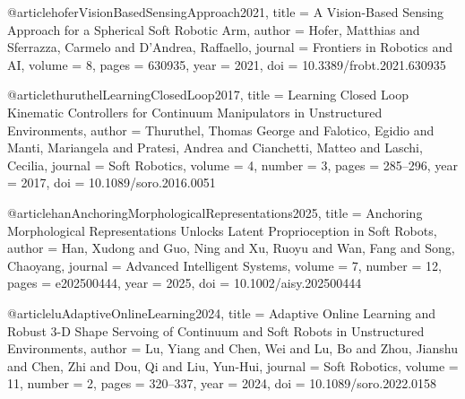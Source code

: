 @article{hoferVisionBasedSensingApproach2021,
  title = {A Vision-Based Sensing Approach for a Spherical Soft Robotic Arm},
  author = {Hofer, Matthias and Sferrazza, Carmelo and D'Andrea, Raffaello},
  journal = {Frontiers in Robotics and AI},
  volume = {8},
  pages = {630935},
  year = {2021},
  doi = {10.3389/frobt.2021.630935}
}

@article{thuruthelLearningClosedLoop2017,
  title = {Learning Closed Loop Kinematic Controllers for Continuum Manipulators in Unstructured Environments},
  author = {Thuruthel, Thomas George and Falotico, Egidio and Manti, Mariangela and Pratesi, Andrea and Cianchetti, Matteo and Laschi, Cecilia},
  journal = {Soft Robotics},
  volume = {4},
  number = {3},
  pages = {285--296},
  year = {2017},
  doi = {10.1089/soro.2016.0051}
}

@article{hanAnchoringMorphologicalRepresentations2025,
  title = {Anchoring Morphological Representations Unlocks Latent Proprioception in Soft Robots},
  author = {Han, Xudong and Guo, Ning and Xu, Ruoyu and Wan, Fang and Song, Chaoyang},
  journal = {Advanced Intelligent Systems},
  volume = {7},
  number = {12},
  pages = {e202500444},
  year = {2025},
  doi = {10.1002/aisy.202500444}
}

@article{luAdaptiveOnlineLearning2024,
  title = {Adaptive Online Learning and Robust 3-D Shape Servoing of Continuum and Soft Robots in Unstructured Environments},
  author = {Lu, Yiang and Chen, Wei and Lu, Bo and Zhou, Jianshu and Chen, Zhi and Dou, Qi and Liu, Yun-Hui},
  journal = {Soft Robotics},
  volume = {11},
  number = {2},
  pages = {320--337},
  year = {2024},
  doi = {10.1089/soro.2022.0158}
}
